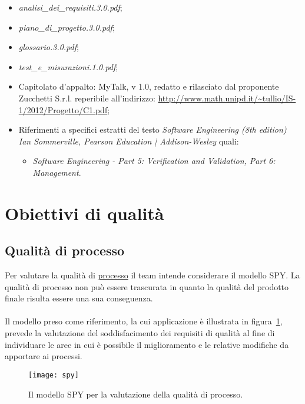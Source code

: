 \begin{itemize}
\item[] \textit{analisi\_dei\_requisiti.3.0.pdf};
\item[] \textit{piano\_di\_progetto.3.0.pdf};
\item[] \textit{glossario.3.0.pdf};
\item[] \textit{test\_e\_misurazioni.1.0.pdf};
\item[] Capitolato d'appalto: MyTalk, v 1.0, redatto e rilasciato dal proponente Zucchetti S.r.l. reperibile all'indirizzo: \url{http://www.math.unipd.it/~tullio/IS-1/2012/Progetto/C1.pdf};

\item[] Riferimenti a specifici estratti del testo \textit{Software Engineering (8th edition) Ian Sommerville, Pearson Education | Addison-Wesley} quali:
\begin{itemize}
  \item[] \textit{Software Engineering - Part 5: Verification and Validation, Part 6: Management}.\\
\end{itemize}
\end{itemize}
\clearpage

\section{Obiettivi di qualità}

\subsection{Qualità di processo}
Per valutare la qualità di \underline{processo} il team intende considerare il modello SPY. La qualità di processo non può essere trascurata in quanto la qualità del prodotto finale risulta essere una sua conseguenza.\\\\
Il modello preso come riferimento, la cui applicazione è illustrata in figura~\ref{fig:spy}, prevede la valutazione del soddisfacimento dei requisiti di qualità al fine di individuare le aree in cui è possibile il miglioramento e le relative modifiche da apportare ai processi.
 
\begin{figure}[h]
\centering
\texttt{[image: spy]}
\caption{Il modello SPY per la valutazione della qualità di processo.}\label{fig:spy}
\end{figure}

